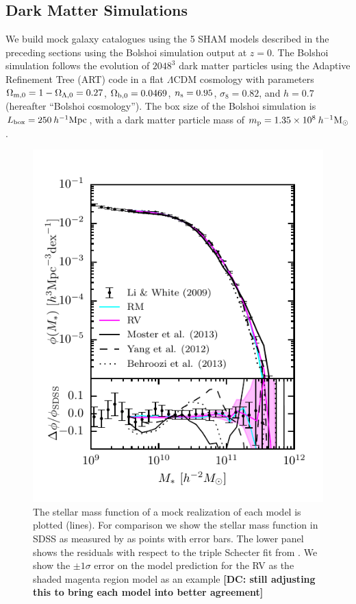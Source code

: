 \documentclass[a4paper,fleqn,usenatbib]{mnras}
\begin{document}
\subsection{Dark Matter Simulations}
\label{sec:dm_sim}

We build mock galaxy catalogues using the 5 SHAM models described in the preceding sections using the Bolshoi \citep{Klypin:2011bd} simulation output at $z=0$.  The Bolshoi simulation follows the evolution of $2048^3$ dark matter particles using the Adaptive Refinement Tree (ART) code \citep*{Kravtsov:1997iy} in a flat $\Lambda$CDM cosmology with parameters $\Omega_{{\rm m},0} = 1 - \Omega_{\Lambda,0} = 0.27$, ${\Omega}_{{\rm b},0} = 0.0469$, $n_{\rm s} = 0.95$, $\sigma_8 = 0.82$, and $h = 0.7$ (hereafter ``Bolshoi cosmology''). The box size of the Bolshoi simulation is $L_{\rm box} = 250 \>h^{-1}{\rm {Mpc}}$, with a dark matter particle mass of $m_{\rm p} = 1.35 \times 10^8 \>h^{-1}\rm M_\odot$.

\begin{figure}
    \includegraphics{figures/stellar_mass_function.pdf}
    \caption{The stellar mass function of a mock realization of each model is plotted (lines).  For comparison we show the stellar mass function in SDSS as measured by \citet{Li:2009kh} as points with error bars.  The lower panel shows the residuals with respect to the triple Schecter fit from \citet{Li:2009kh}.  We show the $\pm 1 \sigma$ error on the model prediction for the RV as the shaded magenta region model as an example {\bf [DC: still adjusting this to bring each model into better agreement]}}
    \label{fig:phi}
\end{figure}
\end{document}
